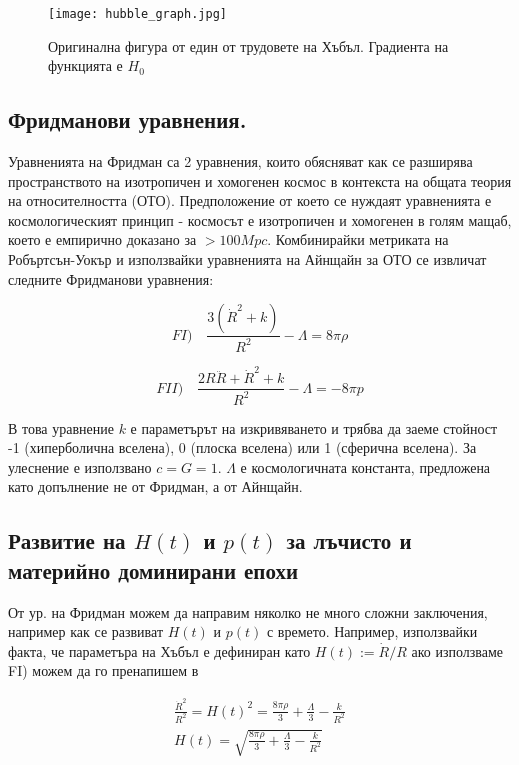 \documentclass[a4paper,12pt]{article}
\begin{document}
\begin{figure}[h!] %
\centering
\texttt{[image: hubble\_graph.jpg]}
\caption{Оригинална фигура от един от трудовете на Хъбъл. Градиента на функцията е $H_0$}
\label{fig:hubble_graph}
\end{figure}

\subsection{Фридманови уравнения.}
Уравненията на Фридман са 2 уравнения, които обясняват как се разширява пространството на изотропичен и хомогенен космос в контекста на общата теория на относителността (ОТО). Предположение от което се нуждаят уравненията е космологическият принцип - космосът е изотропичен и хомогенен в голям мащаб, което е емпирично доказано за $>100Mpc$. Комбинирайки метриката на Робъртсън-Уокър и използвайки уравненията на Айнщайн за ОТО се извличат следните Фридманови уравнения:

\begin{equation}
    FI) \quad \frac{3(\dot{R}^2 + k)} {R^2} - \Lambda = 8\pi \rho
\end{equation}

\begin{equation}
    FII) \quad \frac{2R\ddot{R} + \dot{R}^2 + k}{R^2} - \Lambda = -8\pi p
\end{equation}

В това уравнение $k$ е параметърът на изкривяването и трябва да заеме стойност -1 (хиперболична вселена), 0 (плоска вселена) или 1 (сферична вселена). За улеснение е използвано $c=G=1$. $\Lambda$ е космологичната константа, предложена като допълнение не от Фридман, а от Айнщайн. 


\subsection{Развитие на $H(t)$ и $p(t)$ за лъчисто и материйно доминирани епохи}
От ур. на Фридман можем да направим няколко не много сложни заключения, например как се развиват $H(t)$ и $p(t)$ с времето. Например, използвайки факта, че параметъра на Хъбъл е дефиниран като $H(t):= \dot{R}/R$ ако използваме FI) можем да го пренапишем в 

\begin{gather}
    \frac{\dot{R}^2} {R^2} = H(t)^2 = \frac{8\pi \rho}{3} + \frac{\Lambda}{3} - \frac{k}{R^2}\\
    \label{eq:Hubble_par}
    H(t) = \sqrt{\frac{8\pi \rho}{3} + \frac{\Lambda}{3} - \frac{k}{R^2}}
\end{gather}
\end{document}
